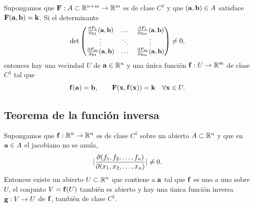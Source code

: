 \begin{teorema}
  \label{teo:funcion_implicita_gen}
  Supongamos que $\mathbf{F}:A\subset\mathbb{R}^{n+m}\rightarrow\mathbb{R}^m$ es de clase $C^1$ y
  que $(\mathbf{a},\mathbf{b})\in A$ satisface $\mathbf{F}(\mathbf{a},\mathbf{b})=\mathbf{k}$. Si el
  determinante
  \begin{equation}
    \label{eq:determinante_implicita}
    \small
    \det
    \begin{pmatrix}
      \frac{\partial F_1}{\partial y_1}(\mathbf{a},\mathbf{b}) & \dots & \frac{\partial F_1}{\partial y_m}(\mathbf{a},\mathbf{b})\\
      \vdots & \ddots & \vdots\\
      \frac{\partial F_m}{\partial y_1}(\mathbf{a},\mathbf{b}) & \dots & \frac{\partial F_m}{\partial y_m}(\mathbf{a},\mathbf{b})
    \end{pmatrix}
    \neq 0,
  \end{equation}
  entonces hay una vecindad $U$ de $\mathbf{a}\in\mathbb{R}^n$ y una \'unica funci\'on
  $\mathbf{f}:U\rightarrow\mathbb{R}^m$ de clase $C^1$ tal que
  \begin{equation}
    \label{eq:conclusion_implicita}
    \mathbf{f}(\mathbf{a})=\mathbf{b},
    \qquad
    \mathbf{F}(\mathbf{x},\mathbf{f}(\mathbf{x}))=\mathbf{k}
    \quad\forall\mathbf{x}\in U .
  \end{equation}
\end{teorema}

\subsection{Teorema de la funci\'on inversa}
\label{subsec:funcion_inversa}

\begin{teorema}
  \label{teo:funcion_inversa}
  Supongamos que $\mathbf{f}:\mathbb{R}^n\rightarrow\mathbb{R}^n$ es de clase $C^1$ sobre un
  abierto $A\subset\mathbb{R}^n$ y que en $\mathbf{a}\in A$ el jacobiano no se anula,
  \begin{equation}
    \label{eq:jacobiano_inversa}
    \lvert \frac{\partial(f_1,f_2,\dots,f_n)}
              {\partial(x_1,x_2,\dots,x_n)} \rvert\neq 0 .
  \end{equation}
  Entonces existe un abierto $U\subset\mathbb{R}^n$ que contiene a $\mathbf{a}$ tal que
  $\mathbf{f}$ es uno a uno sobre $U$, el conjunto $V=\mathbf{f}(U)$ tambi\'en es
  abierto y hay una \'unica funci\'on inversa $\mathbf{g}:V\rightarrow U$ de
  $\mathbf{f}$, tambi\'en de clase $C^1$.
\end{teorema}
